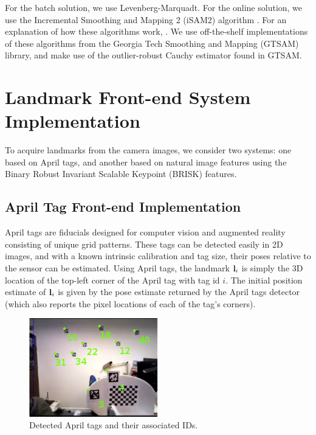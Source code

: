 For the batch solution, we use Levenberg-Marquadt. For the online solution, we use the Incremental Smoothing and Mapping 2 (iSAM2) algorithm \cite{Kaess12ijrr}. For an explanation of how these algorithms work, . We use off-the-shelf implementations of these algorithms from the Georgia Tech Smoothing and Mapping (GTSAM) \cite{gtsam} library, and make use of the outlier-robust Cauchy estimator found in GTSAM. 

\section{Landmark Front-end System Implementation}
To acquire landmarks from the camera images, we consider two systems: one based on April \cite{olson2010tags} tags, and another based on natural image features using the Binary Robust Invariant Scalable Keypoint (BRISK)\cite{Leutenegger2011BRISK} features.

\subsection{April Tag Front-end Implementation}

April tags are fiducials designed for computer vision and augmented reality consisting of unique grid patterns. These tags can be detected easily in 2D images, and with a known intrinsic calibration and tag size, their poses relative to the sensor can be estimated. Using April tags, the landmark $\mathbf{l}_i$ is simply the 3D location of the top-left corner of the April tag with tag id $i$. The initial position estimate of $\mathbf{l}_i$ is given by the pose estimate returned by the April tags detector (which also reports the pixel locations of each of the tag's corners). 

\begin{figure}
	\centering
	\includegraphics[width=0.5\textwidth]{img/graph_slam/apriltags}
	\caption{Detected April tags and their associated IDs.}
	\label{fig:april_tags}
\end{figure}

